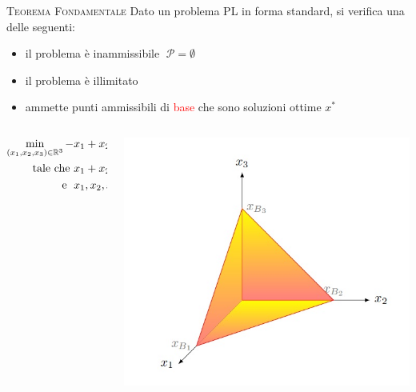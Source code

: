 \begin{frame}[t]{\textsc{\LARGE \textcolor{maroon(x11)}{Teorema Fondamentale}}}
	Dato un problema PL in forma standard, si verifica una delle seguenti: %
	\pause
\begin{itemize}
\item il problema è inammissibile $\;\mathcal{P}=\emptyset$\pause
\item il problema è illimitato\pause
\item ammette punti ammissibili di  \textcolor{red}{base} che sono soluzioni ottime $x^{*}$
\end{itemize}
\pause
\begin{columns}
\begin{column}{0.4\textwidth}
\begin{align*}
\min\limits_{(x_{1},x_{2},x_{3})\in\mathbb{R}^{3}} -&x_{1}+ x_{2}-4x_{3}\\
\text{tale che    }&x_{1}+x_{2}+x_{3}=1,\\
\text{\; e   \;} &x_{1}, x_{2}, x_{3} \geq 0
\end{align*}
\end{column}
\pause
\begin{column}{0.4\textwidth}
	\includegraphics[width=\columnwidth]{Feas.jpg}
\end{column}
\end{columns}
\end{frame}


